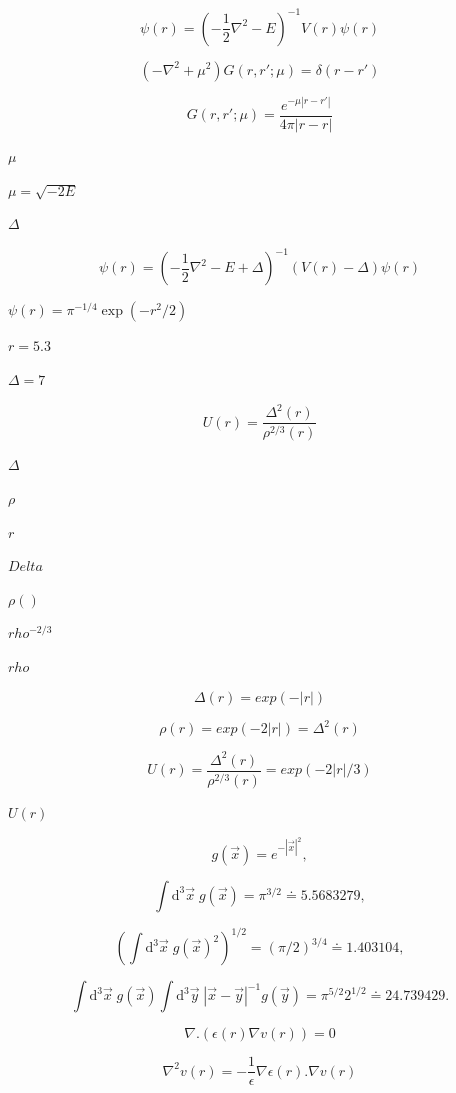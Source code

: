 \documentclass{article}
\begin{document}
\[
\psi(r) = \left( -\frac{1}{2} \nabla^2 - E \right)^{-1} V(r) \psi(r)
\]
\pagebreak

\[
\left(-\nabla^2 + \mu^2 \right) G(r,r'; \mu) = \delta(r-r')
\]
\pagebreak

\[
G(r,r'; \mu) = \frac{e^{-\mu |r-r'|}}{4 \pi |r-r|}
\]
\pagebreak

$\mu$
\pagebreak

$\mu = \sqrt{-2 E}$
\pagebreak

$\Delta$
\pagebreak

\[
\psi(r) = \left( -\frac{1}{2} \nabla^2 - E + \Delta \right)^{-1} \left( V(r) -\Delta\right)  \psi(r)
\]
\pagebreak

$\psi(r)=\pi^{-1/4}\exp(-r^2 / 2)$
\pagebreak

$r=5.3$
\pagebreak

$\Delta=7$
\pagebreak

\[
U(r) = \frac{\Delta^2 (r)}{\rho^{2/3} (r)}
\]
\pagebreak

$ \Delta $
\pagebreak

$ \rho $
\pagebreak

$ r $
\pagebreak

$ Delta $
\pagebreak

$ \rho() $
\pagebreak

$ rho^{-2/3} $
\pagebreak

$ rho $
\pagebreak

\[
\Delta(r) = exp(- | r | )
\]
\pagebreak

\[
\rho(r) = exp(- 2 | r | ) = \Delta^2(r)
\]
\pagebreak

\[
U(r) = \frac{\Delta^2 (r)}{\rho^{2/3} (r)} = exp( - 2 | r | / 3)
\]
\pagebreak

$
U(r) $
\pagebreak

\[ g(\vec{x}) = e^{-|\vec{x}|^2}, \]
\pagebreak

\[
   \int \mathrm{d}^3 \vec{x} \; g(\vec{x}) = \pi^{3/2} \doteq 5.5683279,
\]
\pagebreak

\[
   \left( \int \mathrm{d}^3 \vec{x} \; g(\vec{x})^2 \right)^{1/2} = (\pi/2)^{3/4} \doteq 1.403104,
\]
\pagebreak

\[
   \int \mathrm{d}^3 \vec{x} \; g(\vec{x}) \int \mathrm{d}^3 \vec{y} \; |\vec{x}-\vec{y}|^{-1} g(\vec{y}) = \pi^{5/2} 2^{1/2} \doteq 24.739429.
\]
\pagebreak

\[
\nabla . \left( \epsilon(r) \nabla v(r)  \right) = 0
\]
\pagebreak

\[
   \nabla^2 v(r) = - \frac{1}{\epsilon} \nabla \epsilon(r) .  \nabla v(r)
\]
\pagebreak
\end{document}
